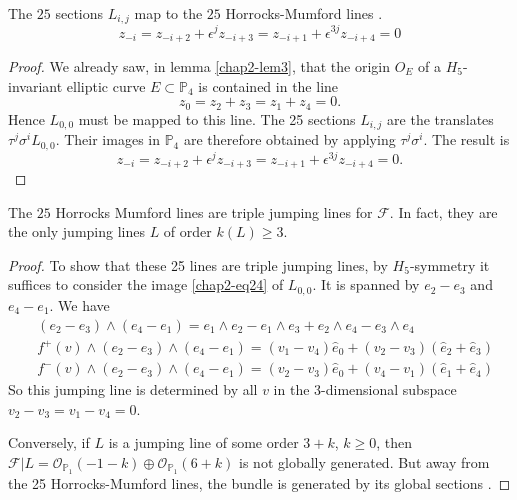 \begin{proposition}\label{chap2-prop13}
The $25$ sections $L_{i,j}$ map to the $25$ Horrocks-Mumford
lines \cite[p.72]{chap2-key6}. 
$$
z_{-i}=z_{-i+2}+\epsilon^{j}z_{-i+3}=z_{-i+1}+\epsilon^{3j}z_{-i+4}=0
$$\pageoriginale
\end{proposition}

\begin{proof}
We already saw, in lemma \ref{chap2-lem3}, that the origin $O_{E}$ of
a $H_{5}$-invariant elliptic curve $E\subset \mathbb{P}_{4}$ is
contained in the line
\begin{equation}
z_{0}=z_{2}+z_{3}=z_{1}+z_{4}=0.\label{chap2-eq24}
\end{equation}
Hence $L_{0,0}$ must be mapped to this line. The 25 sections $L_{i,j}$
are the translates $\tau^{j}\sigma^{i}L_{0,0}$. Their images in
$\mathbb{P}_{4}$ are therefore obtained by applying
$\tau^{j}\sigma^{i}$. The result is
$$
z_{-i}=z_{-i+2}+\epsilon^{j}z_{-i+3}=z_{-i+1}+\epsilon^{3j}z_{-i+4}=0.
$$
\end{proof}

\begin{proposition}\label{chap2-prop14}
The $25$ Horrocks Mumford lines are triple jumping lines for
$\mathscr{F}$. In fact, they are the only jumping lines $L$ of order
$k(L)\geq 3$.
\end{proposition}

\begin{proof}
To show that these 25 lines are triple jumping lines, by
$H_{5}$-symmetry it suffices to consider the image \eqref{chap2-eq24}
of $L_{0,0}$. It is spanned by $e_{2}-e_{3}$ and $e_{4}-e_{1}$. We
have
\begin{align*}
& (e_{2}-e_{3})\wedge (e_{4}-e_{1})=e_{1}\wedge e_{2}-e_{1}\wedge
e_{3}+e_{2}\wedge e_{4}-e_{3}\wedge e_{4}\\[4pt]
& f^{+}(v)\wedge (e_{2}-e_{3})\wedge
(e_{4}-e_{1})=(v_{1}-v_{4})\widehat{e}_{0}+(v_{2}-v_{3})(\widehat{e}_{2}+\widehat{e}_{3})\\[4pt]
& f^{-}(v)\wedge (e_{2}-e_{3})\wedge
(e_{4}-e_{1})=(v_{2}-v_{3})\widehat{e}_{0}+(v_{4}-v_{1})(\widehat{e}_{1}+\widehat{e}_{4})  
\end{align*}\pageoriginale
So this jumping line is determined by all $v$ in the 3-dimensional
subspace $v_{2}-v_{3}=v_{1}-v_{4}=0$.

Conversely, if $L$ is a jumping line of some order $3+k$, $k\geq 0$,
then
$\mathscr{F}|L=\mathscr{O}_{\mathbb{P}_{1}}(-1-k)\oplus \mathscr{O}_{\mathbb{P}_{1}}(6+k)$
is not globally generated. But away from the 25 Horrocks-Mumford
lines, the bundle is generated by its global
sections \cite[p.~75]{chap2-key6}. 
\end{proof}

